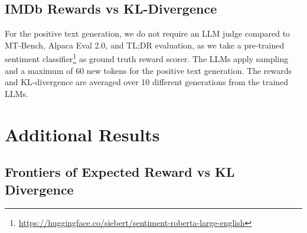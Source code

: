 \documentclass{article}
\theoremstyle{plain}
\theoremstyle{definition}
\theoremstyle{remark}
\begin{document}
\subsection{IMDb Rewards vs KL-Divergence}
\label{imdb-eval}
For the positive text generation, we do not require an LLM judge compared to MT-Bench, Alpaca Eval 2.0, and TL;DR evaluation, as we take a pre-trained sentiment classifier\footnote{\href{https://huggingface.co/siebert/sentiment-roberta-large-english}{https://huggingface.co/siebert/sentiment-roberta-large-english}} as ground truth reward scorer. The LLMs apply sampling and a maximum of 60 new tokens for the positive text generation. The rewards and KL-divergence are averaged over 10 different generations from the trained LLMs.

\section{Additional Results}

\subsection{Frontiers of Expected Reward vs KL Divergence}
\end{document}
